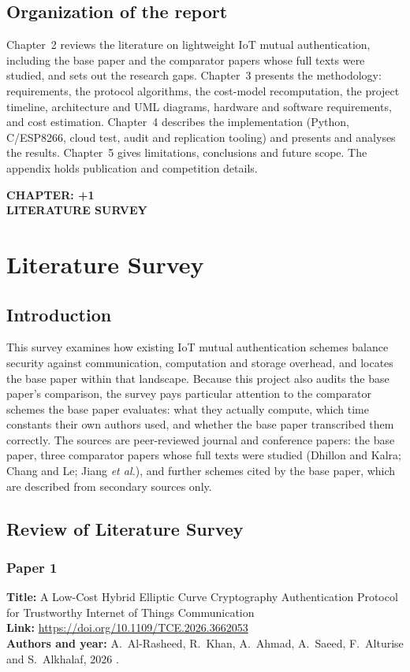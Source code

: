 \documentclass[12pt,a4paper,oneside]{report}
\numberwithin{equation}{chapter}
\newcommand{\ChapterDivider}[1]{%
  \clearpage\thispagestyle{empty}\null\vfill
  \begin{center}{\large\bfseries CHAPTER: \number\numexpr\value{chapter}+1\relax}\\[1.2in]{\large\bfseries\MakeUppercase{#1}}\end{center}
  \vfill\null\clearpage}
\begin{document}
\section{Organization of the report}
Chapter~2 reviews the literature on lightweight IoT mutual authentication, including the base paper and the comparator papers whose full texts were studied, and sets out the research gaps. Chapter~3 presents the methodology: requirements, the protocol algorithms, the cost-model recomputation, the project timeline, architecture and UML diagrams, hardware and software requirements, and cost estimation. Chapter~4 describes the implementation (Python, C/ESP8266, cloud test, audit and replication tooling) and presents and analyses the results. Chapter~5 gives limitations, conclusions and future scope. The appendix holds publication and competition details.

\ChapterDivider{Literature Survey}
\chapter{Literature Survey}
\section{Introduction}
This survey examines how existing IoT mutual authentication schemes balance security against communication, computation and storage overhead, and locates the base paper \cite{alrasheed2026hybrid} within that landscape. Because this project also audits the base paper's comparison, the survey pays particular attention to the comparator schemes the base paper evaluates: what they actually compute, which time constants their own authors used, and whether the base paper transcribed them correctly. The sources are peer-reviewed journal and conference papers: the base paper, three comparator papers whose full texts were studied (Dhillon and Kalra; Chang and Le; Jiang \emph{et al.}), and further schemes cited by the base paper, which are described from secondary sources only.

\section{Review of Literature Survey}

\subsection*{Paper 1}
\noindent\textbf{Title:} A Low-Cost Hybrid Elliptic Curve Cryptography Authentication Protocol for Trustworthy Internet of Things Communication\\
\textbf{Link:} \url{https://doi.org/10.1109/TCE.2026.3662053}\\
\textbf{Authors and year:} A.~Al-Rasheed, R.~Khan, A.~Ahmad, A.~Saeed, F.~Alturise and S.~Alkhalaf, 2026 \cite{alrasheed2026hybrid}.
\end{document}
